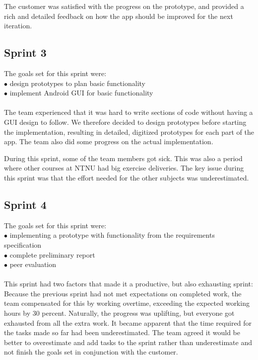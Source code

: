 The customer was satisfied with the progress on the prototype, and provided a rich and detailed feedback on how the app should be improved for the next iteration.

\subsection{Sprint 3}
The goals set for this sprint were:\\
$\bullet$\hspace{0.25cm} design prototypes to plan basic functionality\\
$\bullet$\hspace{0.25cm} implement Android GUI for basic functionality\\\\
The team experienced that it was hard to write sections of code without having a GUI design to follow. We therefore decided to design prototypes before starting the implementation, resulting in detailed, digitized prototypes for each part of the app. The team also did some progress on the actual implementation.

During this sprint, some of the team members got sick. This was also a period where other courses at NTNU had big exercise deliveries. The key issue during this sprint was that the effort needed for the other subjects was underestimated. 

\subsection{Sprint 4}
The goals set for this sprint were:\\
$\bullet$\hspace{0.25cm} implementing a prototype with functionality from the requirements specification\\
$\bullet$\hspace{0.25cm} complete preliminary report\\
$\bullet$\hspace{0.25cm} peer evaluation\\\\
This sprint had two factors that made it a productive, but also exhausting sprint: Because the previous sprint had not met expectations on completed work, the team compensated for this by working overtime, exceeding the expected working hours by 30 percent. Naturally, the progress was uplifting, but everyone got exhausted from all the extra work. It became apparent that the time required for the tasks made so far had been underestimated. The team agreed it would be better to overestimate and add tasks to the sprint rather than underestimate and not finish the goals set in conjunction with the customer.


